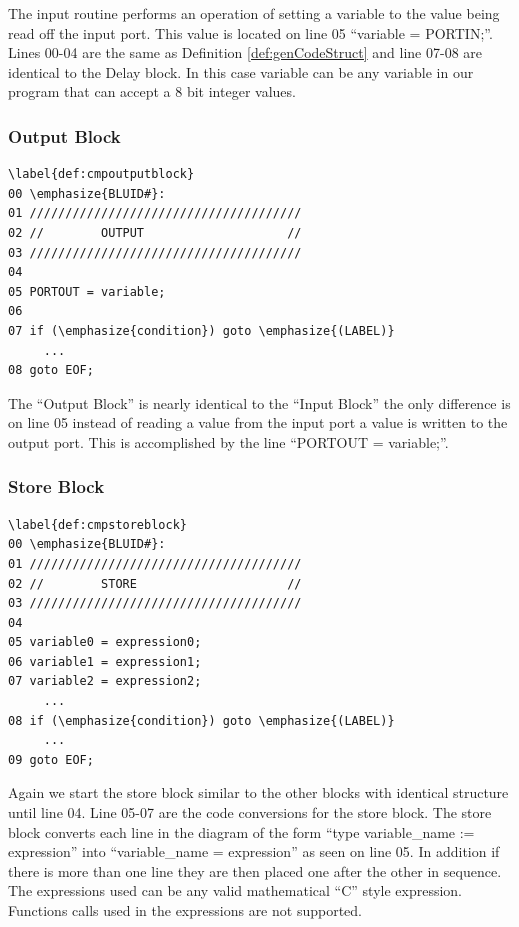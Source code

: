 The input routine performs an operation of setting a variable 
to the value being read off the input port. This value is located 
on line 05 ``variable = PORTIN;''. Lines 00-04 are the same as 
Definition \ref{def:genCodeStruct} and line 07-08 are identical 
to the Delay block. In this case variable can be any variable in
our program that can accept a 8 bit integer values.


\subsubsection{Output Block}
\begin{lstlisting}[frame=single]
\label{def:cmpoutputblock}
00 \emphasize{BLUID#}:
01 //////////////////////////////////////
02 //        OUTPUT                    //
03 //////////////////////////////////////
04
05 PORTOUT = variable;
06 
07 if (\emphasize{condition}) goto \emphasize{(LABEL)}
     ...
08 goto EOF;
\end{lstlisting}

The ``Output Block'' is nearly identical to the ``Input Block'' 
the only difference is on line 05 instead of reading a value from 
the input port a value is written to the output port. This is 
accomplished by the line ``PORTOUT = variable;''.

\subsubsection{Store Block}
\begin{lstlisting}[frame=single]
\label{def:cmpstoreblock}
00 \emphasize{BLUID#}:
01 //////////////////////////////////////
02 //        STORE                     //
03 //////////////////////////////////////
04
05 variable0 = expression0;
06 variable1 = expression1;
07 variable2 = expression2;
     ...
08 if (\emphasize{condition}) goto \emphasize{(LABEL)}
     ...
09 goto EOF;
\end{lstlisting}

Again we start the store block similar to the other blocks with 
identical structure until line 04. Line 05-07 are the code conversions 
for the store block. The store block converts each line in the diagram 
of the form ``type variable\_name := expression'' into ``variable\_name = expression'' 
as seen on line 05. In addition if there is more than one line they 
are then placed one after the other in sequence. The expressions used can be any 
valid mathematical ``C'' style expression. Functions calls used in the 
expressions are not supported.